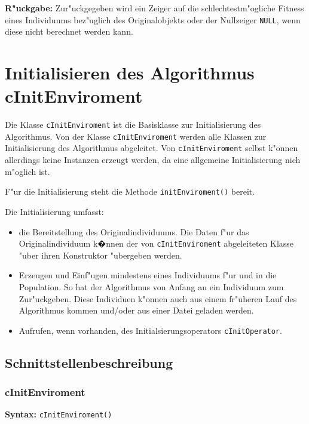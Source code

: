 \bigskip\noindent
\textbf{R"uckgabe:} Zur"uckgegeben wird ein Zeiger auf die schlechtestm"ogliche Fitness eines Individuums bez"uglich des Originalobjekts oder der Nullzeiger \verb|NULL|, wenn diese nicht berechnet werden kann.




\section{Initialisieren des Algorithmus cInitEnviroment}
\label{secInitAlgoritmus}

Die Klasse \verb|cInitEnviroment| ist die Basisklasse zur Initialisierung des Algorithmus. Von der Klasse \verb|cInitEnviroment| werden alle Klassen zur Initialisierung des Algorithmus abgeleitet. Von \verb|cInitEnviroment| selbst k"onnen allerdings keine Instanzen erzeugt werden, da eine allgemeine Initialisierung nich m"oglich ist.

F"ur die Initialisierung steht die Methode \verb|initEnviroment()| bereit.

Die Initialisierung umfasst:
\begin{itemize}
 \item die Bereitstellung des Originalindividuums. Die Daten f"ur das Originalindividuum k�nnen der von \verb|cInitEnviroment| abgeleiteten Klasse "uber ihren Konstruktor "ubergeben werden.
 \item Erzeugen und Einf"ugen mindestens eines Individuums f"ur und in die Population. So hat der Algorithmus von Anfang an ein Individuum zum Zur"uckgeben. Diese Individuen k"onnen auch aus einem fr"uheren Lauf des Algorithmus kommen und/oder aus einer Datei geladen werden.
 \item Aufrufen, wenn vorhanden, des Initialsierungsoperators \verb|cInitOperator|.
\end{itemize}


\subsection{Schnittstellenbeschreibung}

\subsubsection{cInitEnviroment}

\textbf{Syntax:} \verb|cInitEnviroment()| \\

